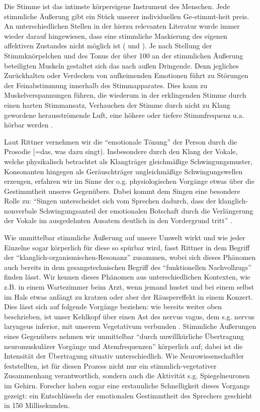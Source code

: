 Die Stimme ist das intimste körpereigene Instrument des Menschen. Jede stimmliche Äußerung gibt ein Stück unserer individuellen Ge-stimmt-heit preis. An unterschiedlichen Stellen in der hierzu relevanten Literatur wurde immer wieder darauf hingewiesen, dass eine stimmliche Maskierung des eigenen affektiven Zustandes nicht möglich ist (\cite[vgl.][279]{deckervoigt2000} und \cite[vgl.][481]{rittner2009a}). Je nach Stellung der Stimmknörpelchen und des Tonus der über 100 an der stimmlichen Äußerung beteiligten Muskeln \autocite[vgl.][40]{cramer1998} gestaltet sich das nach außen Dringende. Denn jegliches Zurückhalten oder Verdecken von aufkeimenden Emotionen führt zu Störungen der Feinabstimmung innerhalb des Stimmapparates. Dies kann zu Muskelverspannungen führen, die wiederum in der erklingenden Stimme durch einen harten Stimmansatz, Verhauchen der Stimme durch nicht zu Klang gewordene herausströmende Luft, eine höhere oder tiefere Stimmfrequenz u.a. hörbar werden \autocite[vgl.][279]{deckervoigt2000}. 

Laut Rittner vernehmen wir die "`emotionale Tönung"' der Person durch die Prosodie [=das, was dazu singt). Insbesondere durch den Klang der Vokale, welche physikalisch betrachtet als Klangträger gleichmäßige Schwingungsmuster, Konsonanten hingegen als Geräuschträger ungleichmäßige Schwingungswellen erzeugen, erfahren wir im Sinne der o.g. physiologischen Vorgänge etwas über die Gestimmtheit unseres Gegenübers. Dabei kommt dem Singen eine besondere Rolle zu: "`Singen unterscheidet sich vom Sprechen dadurch, dass der klanglich-nonverbale Schwingungsanteil der emotionalen Botschaft durch die Verlängerung der Vokale im ausgedehnten Ausatem deutlich in den Vordergrund tritt"' \autocite[205]{rittner2008}.

Wie unmittelbar stimmliche Äußerung auf unsere Umwelt wirkt und wie jeder Einzelne sogar körperlich für diese so spürbar wird, fasst Rittner in dem Begriff der "`klanglich-organismischen-Resonanz"' zusammen, wobei sich dieses Phänomen auch bereits in dem gesangstechnischen Begriff des "`funktionellen Nachvollzugs"' finden lässt. Wir kennen dieses Phänomen aus unterschiedlichen Kontexten, wie z.B. in einem Wartezimmer beim Arzt, wenn jemand hustet und bei einem selbst im Hals etwas anfängt zu kratzen oder aber der Räuspereffekt in einem Konzert. Dies lässt sich auf folgende Vorgänge beziehen: wie bereits weiter oben beschrieben, ist unser Kehlkopf über einen Ast des nervus vagus, dem s.g. nervus laryngeus inferior, mit unserem Vegetativum verbunden \autocite[vgl.][106]{rittner1990}. Stimmliche Äußerungen eines Gegenübers nehmen wir unmittelbar "`durch unwillkürliche Übertragung neuromuskulärer Vorgänge und Atemfrequenzen"' \autocite[482]{rittner2009a} körperlich auf; dabei ist die Intensität der Übertragung situativ unterschiedlich. Wie Neurowissenschaftler feststellten, ist für diesen Prozess nicht nur ein stimmlich-vegetativer Zusammenhang verantwortlich, sondern auch die Aktivität s.g. Spiegelneuronen im Gehirn. Forscher haben sogar eine erstaunliche Schnelligkeit dieses Vorgangs gezeigt: ein Entschlüsseln der emotionalen Gestimmtheit des Sprechers geschieht in 150 Millisekunden\autocite[vgl.][482]{rittner2009a}.

